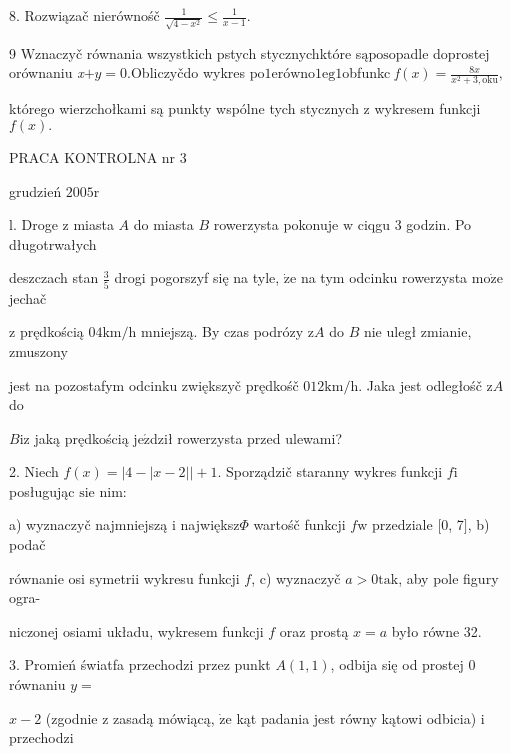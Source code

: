\documentclass[a4paper,12pt]{article}
\begin{document}
8. Rozwiązač nierównośč $\displaystyle \frac{1}{\sqrt{4-x^{2}}}\leq\frac{1}{x-1}.$

9 $\mathrm{W}\mathrm{z}$naczyč równania wszystkich pstych stycznychktóre s$\text{ą} \mathrm{p}\mathrm{o}\mathrm{s}\mathrm{o}$padle d$\mathrm{o}\mathrm{p}$rostej orównaniu {\it x}$+y=0.$Obliczyčdo wykres p$\mathrm{o}1\mathrm{e}\mathrm{r}\text{ó} \mathrm{w}\mathrm{n}\mathrm{o}1\mathrm{e}\mathrm{g}1$obfunkc {\it f}$(x)=\displaystyle \frac{8x}{x^{2}+3,\mathrm{o}\mathrm{k}\mathrm{u}},$

którego wierzchołkami są punkty wspólne tych stycznych $\mathrm{z}$ wykresem funkcji $f(x).$





PRACA KONTROLNA nr 3

grudzień $2005\mathrm{r}$

l. Droge $\mathrm{z}$ miasta $A$ do miasta $B$ rowerzysta pokonuje $\mathrm{w}$ ciqgu 3 godzin. Po długotrwałych

deszczach stan $\displaystyle \frac{3}{5}$ drogi pogorszyf się na tyle, $\dot{\mathrm{z}}\mathrm{e}$ na tym odcinku rowerzysta $\mathrm{m}\mathrm{o}\dot{\mathrm{z}}\mathrm{e}$ jechač

$\mathrm{z}$ prędkością $04\mathrm{k}\mathrm{m}/\mathrm{h}$ mniejszą. By czas podrózy $\mathrm{z}A$ do $B$ nie uległ zmianie, zmuszony

jest na pozostafym odcinku zwiększyč prędkośč $012\mathrm{k}\mathrm{m}/\mathrm{h}$. Jaka jest odległośč $\mathrm{z}A$ do

$B\mathrm{i}\mathrm{z}$ jaką prędkością $\mathrm{j}\mathrm{e}\acute{\mathrm{z}}$dził rowerzysta przed ulewami?

2. Niech $f(x)=|4-|x-2||+1$. Sporządzič staranny wykres funkcji $f\mathrm{i}$ posługując $\mathrm{s}\mathrm{i}\mathrm{e}$ nim:

a) wyznaczyč najmniejszą $\mathrm{i}$ największ$\Phi$ wartośč funkcji $f\mathrm{w}$ przedziale $[0$, 7$]$, b) podač

równanie osi symetrii wykresu funkcji $f$, c) wyznaczyč $a>0\mathrm{t}\mathrm{a}\mathrm{k}$, aby pole figury ogra-

niczonej osiami układu, wykresem funkcji $f$ oraz prostą $x=a$ było równe 32.

3. Promień światfa przechodzi przez punkt $A(1,1)$, odbija się od prostej $0$ równaniu $y=$

$x-2$ (zgodnie $\mathrm{z}$ zasadą mówiącą, $\dot{\mathrm{z}}\mathrm{e}$ kąt padania jest równy kątowi odbicia) $\mathrm{i}$ przechodzi
\end{document}
